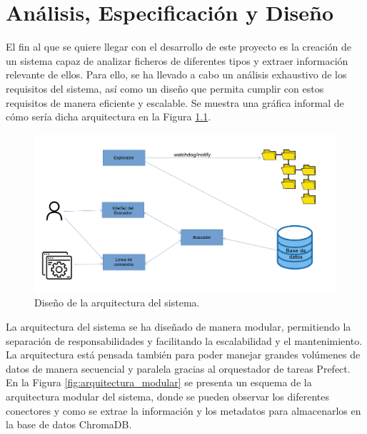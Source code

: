 
\chapter{Análisis, Especificación y Diseño}
\label{analisis}

El fin al que se quiere llegar con el desarrollo de este proyecto es la creación de un sistema capaz de analizar ficheros de diferentes tipos y extraer información relevante de ellos. Para ello, se ha llevado a cabo un análisis exhaustivo de los requisitos del sistema, así como un diseño que permita cumplir con estos requisitos de manera eficiente y escalable. Se muestra una gráfica informal de cómo sería dicha arquitectura en la Figura \ref{fig:arquitectura_flujo}.

\begin{figure}[H]
\centering
\includegraphics[width=\textwidth]{archivos/arquitectura_flujo.png}
\caption[Diseño de la arquitectura del sistema]{Diseño de la arquitectura del sistema.}
\label{fig:arquitectura_flujo}
\end{figure}

La arquitectura del sistema se ha diseñado de manera modular, permitiendo la separación de responsabilidades y facilitando la escalabilidad y el mantenimiento. La arquitectura está pensada también para poder manejar grandes volúmenes de datos de manera secuencial y paralela gracias al orquestador de tareas Prefect. En la Figura \ref{fig:arquitectura_modular} se presenta un esquema de la arquitectura modular del sistema, donde se pueden observar los diferentes conectores y como se extrae la información y los metadatos para almacenarlos en la base de datos ChromaDB.

